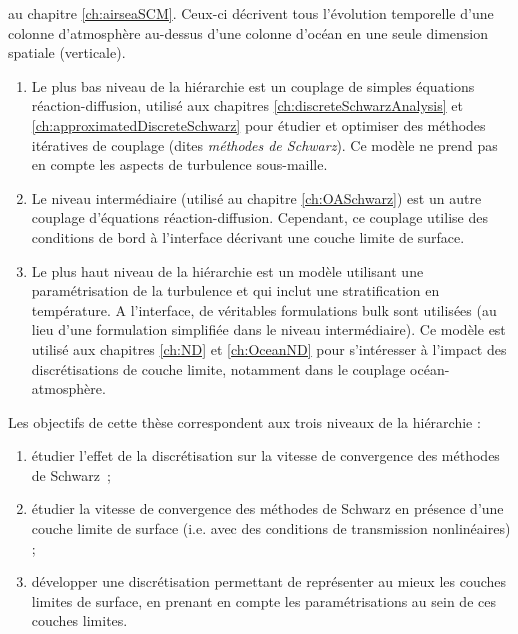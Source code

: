 au chapitre \ref{ch:airseaSCM}. Ceux-ci
décrivent tous l'évolution temporelle d'une colonne d'atmosphère
au-dessus d'une colonne d'océan en une seule dimension spatiale
(verticale).
\par
\begin{enumerate}
	\item Le plus bas niveau de la hiérarchie est un couplage
	de simples équations réaction-diffusion, utilisé aux chapitres
		\ref{ch:discreteSchwarzAnalysis} et
		\ref{ch:approximatedDiscreteSchwarz} pour étudier
		et optimiser des méthodes itératives de
		couplage (dites \textit{méthodes de Schwarz}).
		Ce modèle ne prend pas en compte les aspects
		de turbulence sous-maille.
	\item Le niveau intermédiaire (utilisé au chapitre
		\ref{ch:OASchwarz}) est un autre couplage
		d'équations réaction-diffusion.
		Cependant, ce couplage utilise des conditions de bord
		à l'interface décrivant une couche limite de surface.
\item Le plus haut niveau de la hiérarchie est un modèle utilisant
une paramétrisation de la turbulence et qui inclut une
stratification en température.
A l'interface, de véritables formulations bulk sont utilisées
(au lieu d'une formulation simplifiée dans le niveau intermédiaire).
Ce modèle est utilisé aux chapitres \ref{ch:ND}
et \ref{ch:OceanND} pour
s'intéresser à l'impact des discrétisations de couche limite,
notamment dans le couplage océan-atmosphère.
\end{enumerate}
Les objectifs de cette thèse correspondent aux trois niveaux de la
hiérarchie :
\begin{enumerate}
	\item étudier l'effet de la discrétisation sur la vitesse de
		convergence des méthodes de Schwarz~;
	\item étudier la vitesse de convergence des méthodes de
		Schwarz en présence d'une couche limite de surface
		(i.e. avec des conditions de transmission
		nonlinéaires) ;
	\item développer une discrétisation permettant de représenter
		au mieux les couches limites de surface, en prenant
		en compte les paramétrisations au sein de ces
		couches limites.
\end{enumerate}

